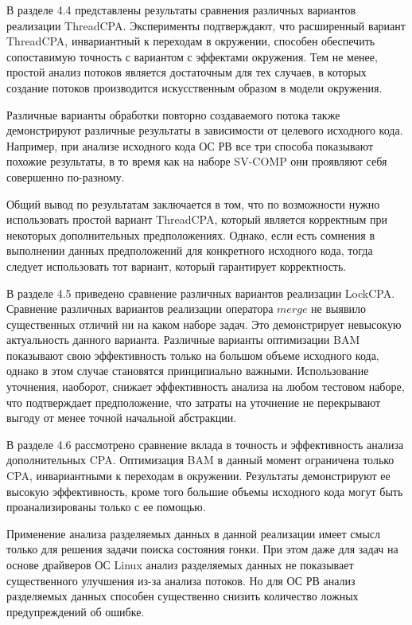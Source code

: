 В разделе 4.4 представлены результаты сравнения различных вариантов реализации ThreadCPA.
Эксперименты подтверждают, что расширенный вариант ThreadCPA, инвариантный к переходам в окружении, способен обеспечить сопоставимую точность с вариантом с эффектами окружения.
Тем не менее, простой анализ потоков является достаточным для тех случаев, в которых создание потоков производится искусственным образом в модели окружения.

Различные варианты обработки повторно создаваемого потока также демонстрируют различные результаты в зависимости от целевого исходного кода.
Например, при анализе исходного кода ОС РВ все три способа показывают похожие результаты, в то время как на наборе SV-COMP они проявляют себя совершенно по-разному. 

Общий вывод по результатам заключается в том, что по возможности нужно использовать простой вариант ThreadCPA, который является корректным при некоторых дополнительных предположениях.
Однако, если есть сомнения в выполнении данных предположений для конкретного исходного кода, тогда следует использовать тот вариант, который гарантирует корректность.

В разделе 4.5 приведено сравнение различных вариантов реализации LockCPA.
Сравнение различных вариантов реализации оператора $merge$ не выявило существенных отличий ни на каком наборе задач.
Это демонстрирует невысокую актуальность данного варианта.
Различные варианты оптимизации BAM показывают свою эффективность только на большом объеме исходного кода, однако в этом случае становятся принципиально важными.
Использование уточнения, наоборот, снижает эффективность анализа на любом тестовом наборе, что подтверждает предположение, что затраты на уточнение не перекрывают выгоду от менее точной начальной абстракции.

В разделе 4.6 рассмотрено сравнение вклада в точность и эффективность анализа дополнительных CPA.
Оптимизация BAM в данный момент ограничена только CPA, инвариантными к переходам в окружении.
Результаты демонстрируют ее высокую эффективность, кроме того большие объемы исходного кода могут быть проанализированы только с ее помощью.

Применение анализа разделяемых данных в данной реализации имеет смысл только для решения задачи поиска состояния гонки.
При этом даже для задач на основе драйверов ОС Linux анализ разделяемых данных не показывает существенного улучшения из-за анализа потоков.
Но для ОС РВ анализ разделяемых данных способен существенно снизить количество ложных предупреждений об ошибке.

